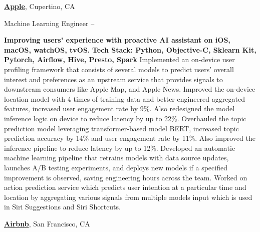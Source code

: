 \documentclass[a4paper,MMMyyyy,nonstopmode]{simpleresumecv}
\begin{document}
\begin{Body}
\BigGap
\Entry
\href{https://www.apple.com/}
{\textbf{Apple}},
Cupertino, CA

\Gap
\BulletItem
Machine Learning Engineer
\hfill
{} --
\begin{Detail}
\SubBulletItem
\textbf{Improving users' experience with proactive AI assistant on iOS, macOS, watchOS, tvOS.}
\SubBulletItem \textbf{Tech Stack: Python, Objective-C, Sklearn Kit, Pytorch, Airflow, Hive, Presto, Spark}
\SubBulletItem
Implemented an on-device user profiling framework that consists of several models to predict users' overall interest and preferences as an upstream service that provides signals to downstream consumers like Apple Map, and Apple News.
\SubBulletItem
Improved the on-device location model with 4 times of training data and better engineered aggregated features, increased user engagement rate by 9\%. Also redesigned the model inference logic on device to reduce latency by up to 22\%.
\SubBulletItem
Overhauled the topic prediction model leveraging transformer-based model BERT, increased topic prediction accuracy by 14\% and user engagement rate by 11\%. Also improved the inference pipeline to reduce latency by up to 12\%.
\SubBulletItem
Developed an automatic machine learning pipeline that retrains models with data source updates, launches A/B testing experiments, and deploys new models if a specified improvement is observed, saving engineering hours across the team.
\SubBulletItem
Worked on action prediction service which predicts user intention at a particular time and location by aggregating various signals from multiple models input which is used in Siri Suggestions and Siri Shortcuts.
\end{Detail}

\BigGap
\Entry
\href{https://press.airbnb.com/about-us/}
{\textbf{Airbnb}},
San Francisco, CA


\end{Body}
\end{document}

